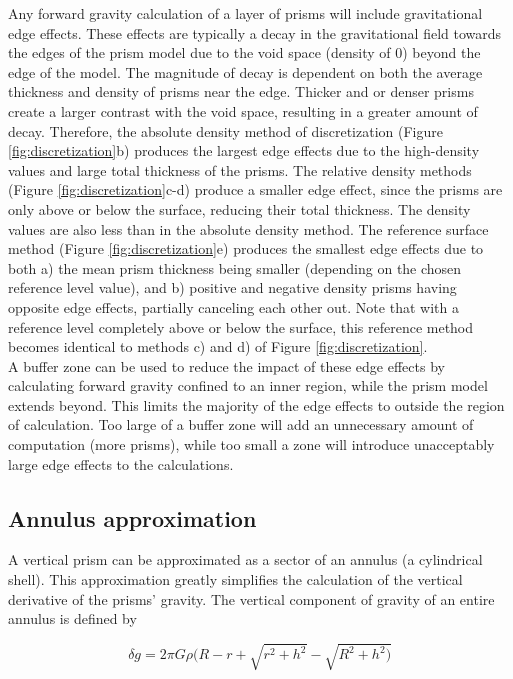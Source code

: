 \documentclass[tc, manuscript]{copernicus}
\begin{document}
Any forward gravity calculation of a layer of prisms will include gravitational edge effects. These effects are typically a decay in the gravitational field towards the edges of the prism model due to the void space (density of 0) beyond the edge of the model. The magnitude of decay is dependent on both the average thickness and density of prisms near the edge. Thicker and or denser prisms create a larger contrast with the void space, resulting in a greater amount of decay. Therefore, the absolute density method of discretization (Figure \ref{fig:discretization}b) produces the largest edge effects due to the high-density values and large total thickness of the prisms. The relative density methods (Figure \ref{fig:discretization}c-d) produce a smaller edge effect, since the prisms are only above or below the surface, reducing their total thickness. The density values are also less than in the absolute density method. The reference surface method (Figure \ref{fig:discretization}e) produces the smallest edge effects due to both a) the mean prism thickness being smaller (depending on the chosen reference level value), and b) positive and negative density prisms having opposite edge effects, partially canceling each other out. Note that with a reference level completely above or below the surface, this reference method becomes identical to methods c) and d) of Figure \ref{fig:discretization}. \\

A buffer zone can be used to reduce the impact of these edge effects by calculating forward gravity confined to an inner region, while the prism model extends beyond. This limits the majority of the edge effects to outside the region of calculation. Too large of a buffer zone will add an unnecessary amount of computation (more prisms), while too small a zone will introduce unacceptably large edge effects to the calculations.

\subsection{Annulus approximation}\label{app:annulus}

A vertical prism can be approximated as a sector of an annulus (a cylindrical shell). This approximation greatly simplifies the calculation of the vertical derivative of the prisms' gravity. The vertical component of gravity of an entire annulus is defined by

\begin{equation} \label{eq:annulus_gravity}
\delta g = 2 \pi G \rho (R - r + \sqrt{r^2 + h^2} - \sqrt{R^2 + h^2)}
\end{equation}
\end{document}
